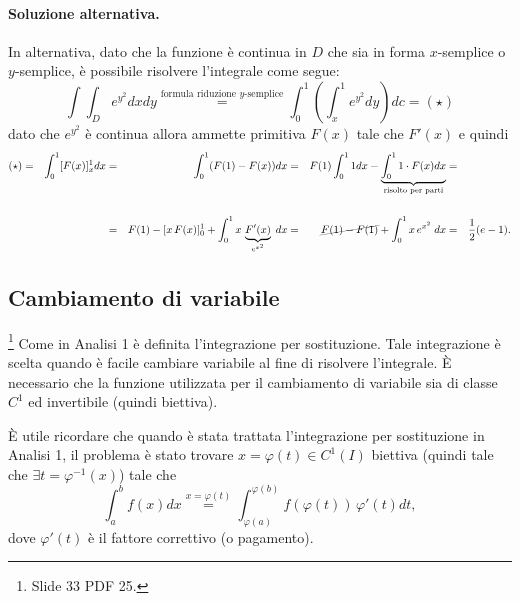 \begin{example}
	\paragraph{Soluzione alternativa.} In alternativa, dato che la funzione è continua in $D$ che sia in forma $x$-semplice o $y$-semplice, è possibile risolvere l'integrale come segue:
	\begin{equation*}
		\int\int_D e^{y^2} dxdy \overset{\text{formula riduzione } y \text{-semplice}}{=} \int_0^1\left(\int_x^1 e^{y^2} dy\right)dc = (\star)
	\end{equation*}
	dato che $e^{y^2}$ è continua allora ammette primitiva $F(x)$ tale che $F'(x)$ e quindi
	\begin{equation*}
		\begin{aligned}
			(\star) &=& \int_0^1[F(x)]_x^1dx &=& \int_0^1(F(1) - F(x)) dx &=& F(1) \int_0^1 1 dx -\underbrace{ \int_0^11\cdot F(x)dx}_{\text{risolto per parti}} &=& \\\\
			&&&=& F(1) - [x\,F(x)]_0^1 + \int_0^1x\, \underbrace{F'(x)}_{e^{x^2}}\;dx &=& \cancel{F(1)-F(1)} +\int_0^1x\, e^{x^2}\; dx &=& \frac{1}{2}(e-1).
		\end{aligned}
	\end{equation*}
\end{example}

\subsection{Cambiamento di variabile}\footnote{Slide 33 PDF 25.}
Come in Analisi 1 è definita l'integrazione per sostituzione. Tale integrazione è scelta quando è facile cambiare variabile al fine di risolvere l'integrale. È necessario che la funzione utilizzata per il cambiamento di variabile sia di classe $C^1$ ed invertibile (quindi biettiva).

È utile ricordare che quando è stata trattata l'integrazione per sostituzione in Analisi 1, il problema è stato trovare $x=\varphi(t)\in C^1(I)$ biettiva (quindi tale che $\exists t=\varphi^{-1}(x)$) tale che
\begin{equation}\label{eq:cambiamento_variabile_integrali_an1}
	\int_a^b f(x) dx \overset{x = \varphi(t)}{=} \int_{\varphi(a)}^{\varphi(b)} f(\varphi(t))\, \varphi'(t) dt,
\end{equation}
dove $ \varphi'(t)$ è il fattore correttivo (o pagamento).

